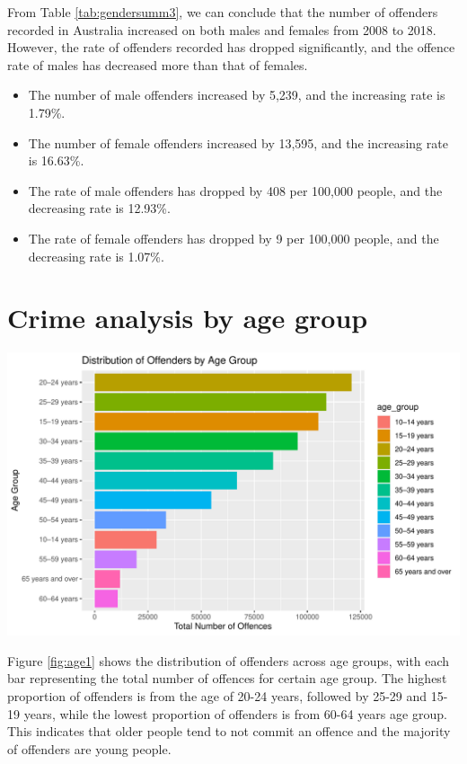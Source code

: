 \documentclass[11pt,a4paper,]{article}
\providecommand{\tightlist}{%
  \setlength{\itemsep}{0pt}\setlength{\parskip}{0pt}}
\let\origfigure\figure
\let\endorigfigure\endfigure
\renewenvironment{figure}[1][2] {
\expandafter\origfigure\expandafter[H]
} {
\endorigfigure
}
\begin{document}
From Table \ref{tab:gendersumm3}, we can conclude that the number of offenders recorded in Australia increased on both males and females from 2008 to 2018. However, the rate of offenders recorded has dropped significantly, and the offence rate of males has decreased more than that of females.

\begin{itemize}
\tightlist
\item
  The number of male offenders increased by 5,239, and the increasing rate is 1.79\%.\\
\item
  The number of female offenders increased by 13,595, and the increasing rate is 16.63\%.\\
\item
  The rate of male offenders has dropped by 408 per 100,000 people, and the decreasing rate is 12.93\%.\\
\item
  The rate of female offenders has dropped by 9 per 100,000 people, and the decreasing rate is 1.07\%.
\end{itemize}

\pagebreak

\section*{Crime analysis by age group}

\begin{figure}
\centering
\includegraphics{ETC5513-Assignment4_files/figure-latex/age1-1.pdf}
\caption{\label{fig:age1}Total offenders across age groups}
\end{figure}

Figure \ref{fig:age1} shows the distribution of offenders across age groups, with each bar representing the total number of offences for certain age group. The highest proportion of offenders is from the age of 20-24 years, followed by 25-29 and 15-19 years, while the lowest proportion of offenders is from 60-64 years age group. This indicates that older people tend to not commit an offence and the majority of offenders are young people.
\end{document}
